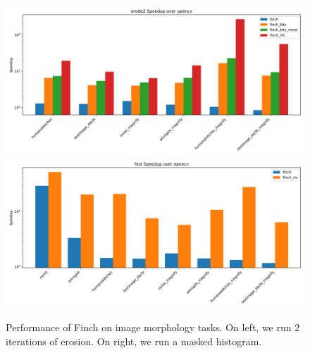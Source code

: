 \begin{figure}
	\includegraphics[width=0.5\linewidth]{erode2_speedup_over_opencv.png}%
	\includegraphics[width=0.5\linewidth]{hist_speedup_over_opencv.png}
 \vspace{-12pt}
    \caption{Performance of Finch on image morphology tasks. On left, we run 2 iterations of erosion. On right, we run a masked histogram.}\label{fig:morphology}
\end{figure}